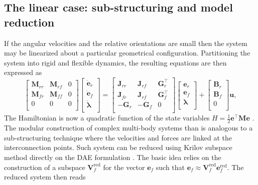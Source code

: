 \documentclass{svjour3}                     %
\begin{document}
\subsection{The linear case: sub-structuring and model reduction}
If the angular velocities and the relative orientations are small then the system may be linearized about a particular geometrical configuration. Partitioning the system into rigid and flexible dynamics, the resulting equations are then expressed as 
\begin{equation}
\label{eq:mbd_linear}
\begin{bmatrix}
\bm{M}_{rr} & \bm{M}_{rf} & 0 \\ 
\bm{M}_{fr} & \bm{M}_{ff} & 0 \\
0 & 0 & 0 \\
\end{bmatrix}
\begin{bmatrix}
\dot{\bm{e}}_r \\ \dot{\bm{e}}_f \\ \dot{\bm{\lambda}} \\ 
\end{bmatrix} = 
\begin{bmatrix}
\bm{J}_{rr} & \bm{J}_{rf} & \bm{G}_r^\top \\ 
\bm{J}_{fr} & \bm{J}_{rf} & \bm{G}_f^\top \\ 
-\bm{G}_r & -\bm{G}_f & 0 \\
\end{bmatrix}
\begin{bmatrix}
\bm{e}_r \\ \bm{e}_f \\ {\bm{\lambda}} \\ 
\end{bmatrix} + 
\begin{bmatrix}
\bm{B}_r \\ \bm{B}_f \\ 0 \\
\end{bmatrix}\bm{u},
\end{equation}
The Hamiltonian is now a quadratic function of the state variables $H = \frac{1}{2} \bm{e}^\top\bm{M}\bm{e}$ \cite{beattie2018linear}.
The modular construction of complex multi-body systems than is analogous to a sub-structuring technique \cite{substructuring} where the velocities and forces are linked at the interconnection points. Such system can be reduced using Krilov subspace method directly on the DAE formulation \cite{phdae_red}. The basic idea relies on the construction of a subspace $\bm{V}_f^{\text{red}}$ for the vector $\bm{e}_f$ such that $\bm{e}_f \approx \bm{V}_f^{\text{red}} \bm{e}_f^{\text{red}}$. The reduced system then reads
\end{document}
